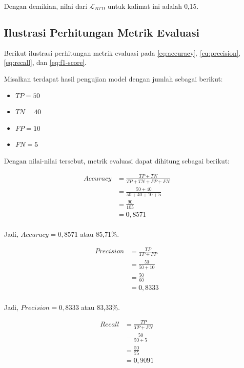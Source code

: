 Dengan demikian, nilai dari \(\mathcal{L}_{RTD}\) untuk kalimat ini adalah 0,15.

\subsection{Ilustrasi Perhitungan Metrik Evaluasi} \label{subsec:ilustrasi_perhitungan_metrik_evaluasi}

Berikut ilustrasi perhitungan metrik evaluasi pada \ref{eq:accuracy}, \ref{eq:precision}, \ref{eq:recall}, dan \ref{eq:f1-score}.

Misalkan terdapat hasil pengujian model dengan jumlah sebagai berikut:
\begin{itemize}[noitemsep]
    \item \(TP = 50\)
    \item \(TN = 40\)
    \item \(FP = 10\)
    \item \(FN = 5\)
\end{itemize}
Dengan nilai-nilai tersebut, metrik evaluasi dapat dihitung sebagai berikut:

\begin{align*}
    \textit{Accuracy} &= \frac{TP + TN}{TP + TN + FP + FN} \\
    &= \frac{50 + 40}{50 + 40 + 10 + 5} \\
    &= \frac{90}{105} \\
    &= 0{,}8571\\
\end{align*}

Jadi, \(\textit{Accuracy} = 0{,}8571\) atau 85,71\%.

\begin{align*}
    \textit{Precision} &= \frac{TP}{TP + FP} \\
    &= \frac{50}{50 + 10} \\
    &= \frac{50}{60} \\
    &= 0{,}8333\\
\end{align*}

Jadi, \(\textit{Precision} = 0{,}8333\) atau 83,33\%.


\begin{align*}
    \textit{Recall} &= \frac{TP}{TP + FN} \\
    &= \frac{50}{50 + 5} \\
    &= \frac{50}{55} \\
    &= 0{,}9091\\
\end{align*}

